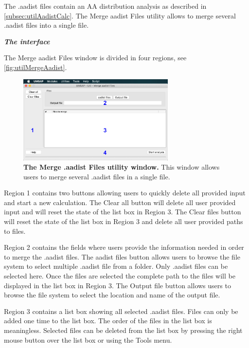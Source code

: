 The .aadist files contain an AA distribution analysis as described in \autoref{subsec:utilAadistCalc}. The Merge aadist Files utility allows to merge several .aadist files into a single file.

\textit{\textbf{The interface}}

The Merge aadist Files window is divided in four regions, see \autoref{fig:utilMergeAadist}.

\begin{figure}[h]
	\centering
	\includegraphics[width=0.7\textwidth]{./IMAGES/UTIL-Maadist-WINDOW/util-maadist.jpg}	    
	\caption[The Merge .aadist Files utility window]{\textbf{The Merge .aadist Files utility window.} This window allows users to merge several .aadist files in a single file.}
	\label{fig:utilMergeAadist}
	\vspace{-5pt} 	
\end{figure}

Region \num{1} contains two buttons allowing users to quickly delete all provided input and start a new calculation. The Clear all button will delete all user provided input and will reset the state of the list box in Region \num{3}. The Clear files button will reset the state of the list box in Region \num{3} and delete all user provided paths to files.

Region \num{2} contains the fields where users provide the information needed in order to merge the .aadist files. The aadist files button allows users to browse the file system to select multiple .aadist file from a folder. Only .aadist files can be selected here. Once the files are selected the complete path to the files will be displayed in the list box in Region \num{3}. The Output file button allows users to browse the file system to select the location and name of the output file.

Region \num{3} contains a list box showing all selected .aadist files. Files can only be added one time to the list box. The order of the files in the list box is meaningless. Selected files can be deleted from the list box by pressing the right mouse button over the list box or using the Tools menu. 

